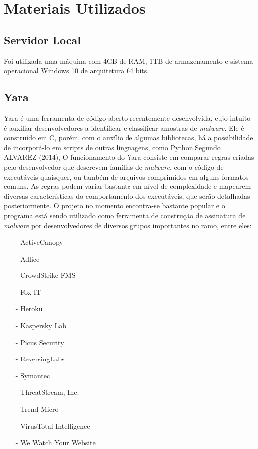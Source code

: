 \section{Materiais Utilizados}
\label{l.material}

\subsection{Servidor Local} %
\label{sub:servidor}

Foi utilizada uma máquina com 4GB de RAM, 1TB de armazenamento e sistema operacional Windows 10 de arquitetura 64 bits.

\subsection{Yara}
\label{sub:Yara}

Yara é uma ferramenta de código aberto recentemente desenvolvida, cujo intuito é
auxiliar desenvolvedores a identificar e classificar amostras de
\textit{malware}. Ele é construído em C, porém, com o auxílio de algumas
bibliotecas, há a possibilidade de incorporá-lo em scripts de outras linguagens,
como Python.Segundo ALVAREZ (2014), O funcionamento do Yara consiste em comparar
regras criadas pelo desenvolvedor que descrevem famílias de \textit{malware},
com o código de executáveis quaisquer, ou também de arquivos comprimidos em
alguns formatos comuns. As regras podem variar bastante em nível de complexidade
e mapearem diversas características do comportamento dos executáveis, que serão
detalhadas posteriormente. O projeto no momento encontra-se bastante popular e o
programa está sendo utilizado como ferramenta de construção de assinatura de
\textit{malware} por desenvolvedores de diversos grupos importantes no ramo,
entre eles:
\begin{itemize}
	\item[-] ActiveCanopy
	\item[-] Adlice
	\item[-] CrowdStrike FMS
	\item[-] Fox-IT
	\item[-] Heroku
	\item[-] Kaspersky Lab
	\item[-] Picus Security
	\item[-] ReversingLabs
	\item[-] Symantec
	\item[-] ThreatStream, Inc.
	\item[-] Trend Micro
	\item[-] VirusTotal Intelligence
	\item[-] We Watch Your Website
\end{itemize}

